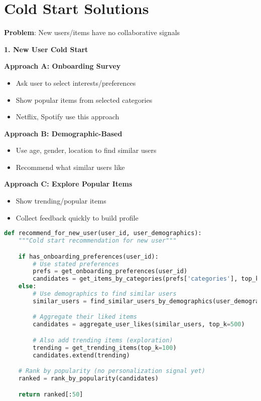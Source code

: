 \documentclass[10pt]{article}
\begin{document}
\section{Cold Start Solutions}

\textbf{Problem}: New users/items have no collaborative signals

\textbf{1. New User Cold Start}

\textbf{Approach A: Onboarding Survey}
\begin{itemize}
\item Ask user to select interests/preferences
\item Show popular items from selected categories
\item Netflix, Spotify use this approach
\end{itemize}

\textbf{Approach B: Demographic-Based}
\begin{itemize}
\item Use age, gender, location to find similar users
\item Recommend what similar users like
\end{itemize}

\textbf{Approach C: Explore Popular Items}
\begin{itemize}
\item Show trending/popular items
\item Collect feedback quickly to build profile
\end{itemize}

\begin{lstlisting}[language=Python]
def recommend_for_new_user(user_id, user_demographics):
    """Cold start recommendation for new user"""

    if has_onboarding_preferences(user_id):
        # Use stated preferences
        prefs = get_onboarding_preferences(user_id)
        candidates = get_items_by_categories(prefs['categories'], top_k=500)
    else:
        # Use demographics to find similar users
        similar_users = find_similar_users_by_demographics(user_demographics, top_k=100)

        # Aggregate their liked items
        candidates = aggregate_user_likes(similar_users, top_k=500)

        # Also add trending items (exploration)
        trending = get_trending_items(top_k=100)
        candidates.extend(trending)

    # Rank by popularity (no personalization signal yet)
    ranked = rank_by_popularity(candidates)

    return ranked[:50]
\end{lstlisting}
\end{document}
